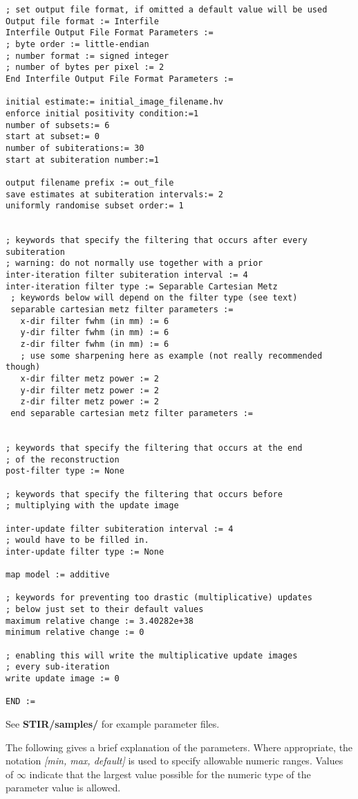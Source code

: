 \documentclass{article}
\begin{document}
{\begin{verbatim}
; set output file format, if omitted a default value will be used
Output file format := Interfile 
Interfile Output File Format Parameters := 
; byte order := little-endian 
; number format := signed integer 
; number of bytes per pixel := 2 
End Interfile Output File Format Parameters :=

initial estimate:= initial_image_filename.hv
enforce initial positivity condition:=1
number of subsets:= 6
start at subset:= 0
number of subiterations:= 30
start at subiteration number:=1

output filename prefix := out_file
save estimates at subiteration intervals:= 2
uniformly randomise subset order:= 1


; keywords that specify the filtering that occurs after every subiteration
; warning: do not normally use together with a prior
inter-iteration filter subiteration interval := 4
inter-iteration filter type := Separable Cartesian Metz
 ; keywords below will depend on the filter type (see text)
 separable cartesian metz filter parameters := 
   x-dir filter fwhm (in mm) := 6 
   y-dir filter fwhm (in mm) := 6 
   z-dir filter fwhm (in mm) := 6 
   ; use some sharpening here as example (not really recommended though)
   x-dir filter metz power := 2 
   y-dir filter metz power := 2 
   z-dir filter metz power := 2 
 end separable cartesian metz filter parameters := 


; keywords that specify the filtering that occurs at the end
; of the reconstruction
post-filter type := None

; keywords that specify the filtering that occurs before 
; multiplying with the update image

inter-update filter subiteration interval := 4
; would have to be filled in.
inter-update filter type := None

map model := additive

; keywords for preventing too drastic (multiplicative) updates
; below just set to their default values
maximum relative change := 3.40282e+38
minimum relative change := 0

; enabling this will write the multiplicative update images 
; every sub-iteration
write update image := 0

END :=
\end{verbatim}
}

See \textbf{STIR/samples/} for example parameter files.

The following gives a brief explanation of the parameters. Where 
appropriate, the notation \textit{[min, max, default]} is used to 
specify allowable numeric ranges. Values of \textit{\ensuremath{\infty}} indicate 
that the largest value possible for the numeric type of the parameter 
value is allowed.
\end{document}
